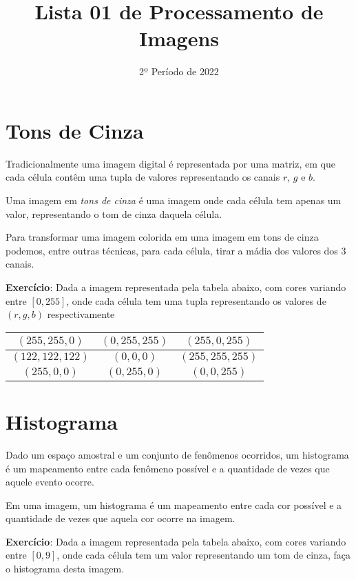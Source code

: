 \documentclass[12pt]{article}
\title{Lista 01 de Processamento de Imagens}
\date{2º Período de 2022}
\begin{document}
\maketitle


\vspace{3em}

\section{Tons de Cinza}

Tradicionalmente uma imagem digital é representada por uma matriz, em que cada célula contêm uma tupla de valores representando os canais $r$, $g$ e $b$.

Uma imagem em \textit{tons de cinza} é uma imagem onde cada célula tem apenas um valor, representando o tom de cinza daquela célula.

Para transformar uma imagem colorida em uma imagem em tons de cinza podemos, entre outras técnicas, para cada célula, tirar a mádia dos valores dos 3 canais.


\textbf{Exercício}: Dada a imagem representada pela tabela abaixo, com cores variando entre $[0, 255]$, onde cada célula tem uma tupla representando os valores de $(r, g, b)$ respectivamente

\begin{tabular}{|c|c|c|}
\hline
$(255, 255,   0)$ & $(  0, 255, 255)$ & $(255,   0, 255)$ \\ \hline
$(122, 122, 122)$ & $(  0,   0,   0)$ & $(255, 255, 255)$ \\ \hline
$(255,   0,   0)$ & $(  0, 255,   0)$ & $(  0,   0, 255)$ \\ \hline

\end{tabular}



\break



\section{Histograma}

Dado um espaço amostral e um conjunto de fenômenos ocorridos, um histograma é um mapeamento entre cada fenômeno possível e a quantidade de vezes que aquele evento ocorre.

Em uma imagem, um histograma é um mapeamento entre cada cor possível e a quantidade de vezes que aquela cor ocorre na imagem.

\textbf{Exercício}: Dada a imagem representada pela tabela abaixo, com cores variando entre $[0, 9]$, onde cada célula tem um valor representando um tom de cinza, faça o histograma desta imagem.
\end{document}
